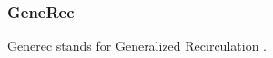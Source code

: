 \subsubsection{GeneRec}

Generec stands for Generalized Recirculation \cite{o1996bio}\cite{o1996leabra}.


